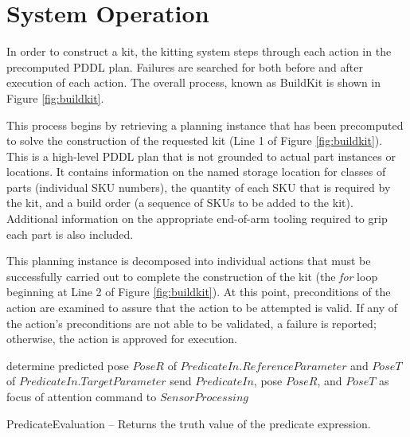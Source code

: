 \section{System Operation}
\label{sect:operation}
In order to construct a kit, the kitting system steps through each action in
the precomputed PDDL plan. Failures are searched for both before and after execution of 
each action. The overall process, known as {\sc BuildKit} is shown in Figure
\ref{fig:buildkit}. 

This process begins by retrieving a planning instance that has been 
precomputed to solve the construction of the requested kit (Line 1 of 
Figure \ref{fig:buildkit}). This is a high-level PDDL
plan that is not grounded to actual part instances or locations. It contains information
on the named storage location for classes of parts (individual SKU numbers), 
the quantity of each SKU that is required by the kit, and a build order (a sequence
of SKUs to be added to the kit). Additional information on the appropriate
end-of-arm tooling required to grip each part is also included.

This planning instance is decomposed into individual actions that must
be successfully carried out to complete the construction of the kit (the
{\it for} loop beginning at Line 2 of Figure \ref{fig:buildkit}). At this point,
preconditions of the action are examined to assure that the action to be attempted
is valid. If any of the action's preconditions are not able to be validated,
a failure is reported; otherwise, the action is approved for execution.
%
\begin{algorithm}[h!]
 	determine predicted pose $PoseR$ of $PredicateIn.ReferenceParameter$
 	and $PoseT$ of $PredicateIn.TargetParameter$ \;
 	send $PredicateIn$, pose $PoseR$, and $PoseT$ as focus of attention command to $SensorProcessing$\;
\caption{{\sc PredicateEvaluation} -- Returns the truth value of the predicate expression.}
\label{fig:predicateEval}
\end{algorithm}
%
